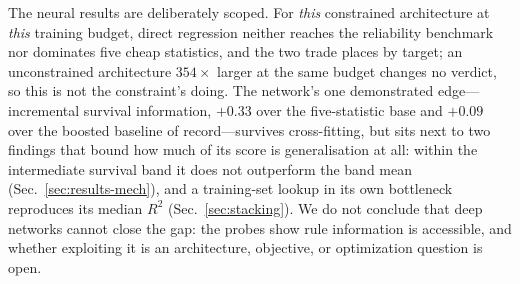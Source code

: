 \documentclass[aip,cha,amsmath,amssymb,reprint,floatfix]{revtex4-2}
\newcommand{\rtwo}{$R^2$}
\begin{document}
The neural results are deliberately scoped. For \emph{this} constrained
architecture at \emph{this} training budget, direct regression neither reaches
the reliability benchmark nor dominates five cheap statistics, and the two
trade places by target; an unconstrained architecture $354\times$ larger at
the same budget changes no verdict, so this is not the constraint's doing. The
network's one demonstrated edge---incremental survival information, $+0.33$
over the five-statistic base and $+0.09$ over the boosted baseline of
record---survives cross-fitting, but sits next to two findings that bound how
much of its score is generalisation at all: within the intermediate survival band it does not
outperform the band mean (Sec.~\ref{sec:results-mech}), and a training-set
lookup in its own bottleneck reproduces its median \rtwo{}
(Sec.~\ref{sec:stacking}). We do not conclude that deep networks cannot close
the gap: the probes show rule information is accessible, and whether
exploiting it is an architecture, objective, or optimization question is open.
\end{document}
